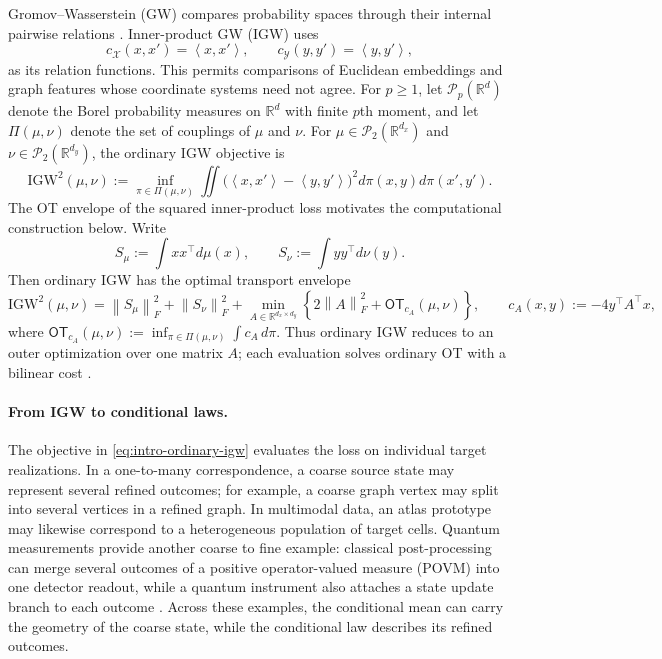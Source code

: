 \documentclass[11pt]{article}
\newcommand{\R}{\mathbb R}
\newcommand{\cP}{\mathcal P}
\newcommand{\ip}[2]{\left\langle #1,#2\right\rangle}
\newcommand{\norm}[1]{\left\lVert #1\right\rVert}
\newcommand{\IGW}{\mathrm{IGW}}
\theoremstyle{plain}
\theoremstyle{definition}
\theoremstyle{remark}
\begin{document}
Gromov--Wasserstein (GW) compares probability spaces through their internal pairwise
relations \cite{Memoli,PeyreCuturiSolomon}. Inner-product GW (IGW) uses
\[
  c_{\mathcal X}(x,x')=\ip{x}{x'},
  \qquad c_{\mathcal Y}(y,y')=\ip{y}{y'},
\]
as its relation functions. This permits comparisons of Euclidean embeddings and
graph features whose coordinate systems need not agree. For $p\ge1$, let
$\cP_p(\R^d)$ denote the Borel probability measures on $\R^d$ with finite
$p$th moment, and let $\Pi(\mu,\nu)$ denote the set of couplings of $\mu$ and
$\nu$. For $\mu\in\cP_2(\R^{d_x})$ and $\nu\in\cP_2(\R^{d_y})$, the ordinary
IGW objective is
\begin{equation}\label{eq:intro-ordinary-igw}
 \IGW^2(\mu,\nu)
 :=\inf_{\pi\in\Pi(\mu,\nu)}
 \iint\bigl(\ip{x}{x'}-\ip{y}{y'}\bigr)^2
 d\pi(x,y)d\pi(x',y').
\end{equation}
The OT envelope of the squared inner-product loss motivates the computational
construction below. Write
\[
 S_\mu:=\int xx^\top d\mu(x),\qquad
 S_\nu:=\int yy^\top d\nu(y).
\]
Then ordinary IGW has the optimal transport envelope
\begin{equation}\label{eq:intro-ordinary-igw-envelope}
 \IGW^2(\mu,\nu)
 =\norm{S_\mu}_F^2+\norm{S_\nu}_F^2
 +\min_{A\in\R^{d_x\times d_y}}
 \left\{2\norm A_F^2+\mathsf{OT}_{c_A}(\mu,\nu)\right\},
 \qquad c_A(x,y):=-4y^\top A^\top x,
\end{equation}
where
$\mathsf{OT}_{c_A}(\mu,\nu):=\inf_{\pi\in\Pi(\mu,\nu)}\int c_A\,d\pi$.
Thus ordinary IGW reduces to an outer optimization over one matrix $A$; each
evaluation solves ordinary OT with a bilinear cost
\cite{ZhangGoldfeldMrouehSriperumbudur}.

\paragraph{From IGW to conditional laws.}
The objective in \eqref{eq:intro-ordinary-igw} evaluates the loss on individual
target realizations. In a one-to-many correspondence, a coarse source state may
represent several refined outcomes; for example, a coarse graph vertex may split
into several vertices in a refined graph. In multimodal data, an atlas prototype
may likewise correspond to a heterogeneous population of target cells. Quantum
measurements provide another coarse to fine example: classical post-processing can
merge several outcomes of a positive operator-valued measure (POVM) into one
detector readout, while a quantum instrument also attaches a state update branch to
each outcome \cite{OreshkovCalsamiglia2009,LeppajarviSedlak2021}. Across these
examples, the conditional mean can carry
the geometry of the coarse state, while the conditional law describes its refined
outcomes.
\end{document}
